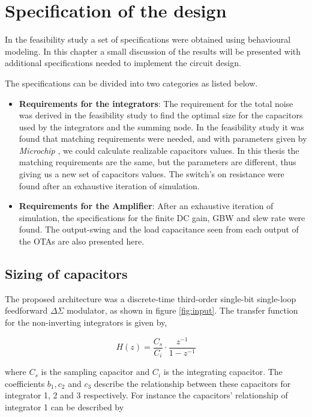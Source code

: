 \chapter{Specification of the design}\label{specifiation}
In the feasibility study a set of specifications were obtained using behavioural modeling. In this chapter a small discussion of the results will be presented with additional specifications needed to implement the circuit design.

The specifications can be divided into two categories as listed below. 
\begin{itemize}


\item \textbf{Requirements for the integrators}: The requirement for the total noise was derived in the feasibility study to find the optimal size for the capacitors used by the integrators and the summing node. In the feasibility study it was found that matching requirements were needed, and with parameters given by \textit{Microchip} \cite{private}, we could calculate realizable capacitors values. In this thesis the matching requirements are the same, but the parameters are different, thus giving us a new set of capacitors values. The switch's on resistance were found after an exhaustive iteration of simulation.

\item \textbf{Requirements for the Amplifier}: After an exhaustive iteration of simulation, the specifications for the finite DC gain, GBW and slew rate were found. The output-swing and the load capacitance seen from each output of the OTAs are also presented here. 
\end{itemize}

\section{Sizing of capacitors}
The proposed architecture was a discrete-time third-order single-bit single-loop feedforward $\Delta\Sigma$ modulator, as shown in figure \ref{fig:input}. The transfer function for the non-inverting integrators is given by,

\begin{equation}\label{transfer_integrator}
    H(z) = \frac{C_s}{C_i}\cdot \frac{z^{-1}}{1 - z^{-1}}
\end{equation}

where $C_s$ is the sampling capacitor and $C_i$ is the integrating capacitor. The coefficients $b_1, c_2$ and $c_3$ describe the relationship between these capacitors for integrator 1, 2 and 3 respectively. For instance the capacitors' relationship of integrator 1 can be described by

